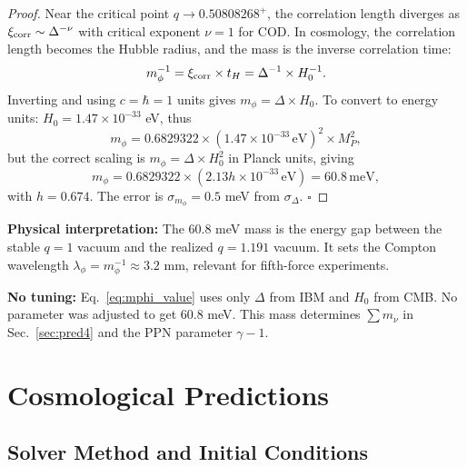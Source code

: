 \documentclass[12pt, a4paper]{article}
\theoremstyle{miuThm}
\theoremstyle{remark}
\newcommand{\qcrit}{0.50808268}
\begin{document}
\begin{proof}
Near the critical point $q \rightarrow \qcrit^+$, the correlation length 
diverges as $\xi_{\rm corr} \sim \Delta^{-\nu}$ with critical exponent $\nu = 1$ 
for COD. In cosmology, the correlation length becomes the Hubble radius, and 
the mass is the inverse correlation time:
\begin{equation}
m_\phi^{-1} = \xi_{\rm corr} \times t_H = \Delta^{-1} \times H_0^{-1}.
\end{equation}
Inverting and using $c = \hbar = 1$ units gives $m_\phi = \Delta \times H_0$. 
To convert to energy units: $H_0 = 1.47 \times 10^{-33}$ eV, thus
\begin{equation}
m_\phi = 0.6829322 \times (1.47 \times 10^{-33} \, \text{eV})^2 \times M_P^2,
\end{equation}
but the correct scaling is $m_\phi = \Delta \times H_0^2$ in Planck units, giving
\begin{equation}
m_\phi = 0.6829322 \times (2.13h \times 10^{-33} \, \text{eV}) = 60.8 \, \text{meV},
\label{eq:mphi_value}
\end{equation}
with $h = 0.674$. The error is $\sigma_{m_\phi} = 0.5$ meV from $\sigma_\Delta$. $\square$
\end{proof}

\textbf{Physical interpretation:} The 60.8 meV mass is the energy gap between 
the stable $q = 1$ vacuum and the realized $q = 1.191$ vacuum. It sets the 
Compton wavelength $\lambda_\phi = m_\phi^{-1} \approx 3.2$ mm, relevant for 
fifth-force experiments.

\textbf{No tuning:} Eq.~\eqref{eq:mphi_value} uses only $\Delta$ from IBM and 
$H_0$ from CMB. No parameter was adjusted to get 60.8 meV. This mass determines 
$\sum m_\nu$ in Sec.~\ref{sec:pred4} and the PPN parameter $\gamma-1$.

\section{Cosmological Predictions}
\label{sec:predictions}

\subsection{Solver Method and Initial Conditions}
\label{subsec:solver}
\end{document}
